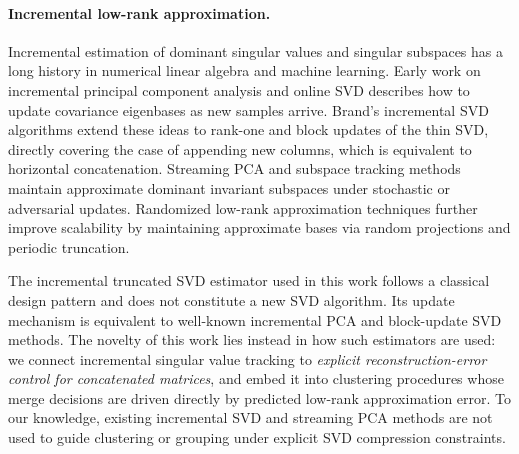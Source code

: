 \documentclass[10pt]{article} %
\begin{document}
\paragraph{Incremental low-rank approximation.}
Incremental estimation of dominant singular values and singular subspaces has a long history in numerical linear algebra and machine learning.
Early work on incremental principal component analysis and online SVD
\citep{hall1998incremental,levy2000sequential}
describes how to update covariance eigenbases as new samples arrive.
Brand’s incremental SVD algorithms
\citep{brand2002incremental,brand2006fast}
extend these ideas to rank-one and block updates of the thin SVD, directly covering the case of appending new columns, which is equivalent to horizontal concatenation. Streaming PCA and subspace tracking methods
\citep{warmuth2007randomized,mitliagkas2013memory}
maintain approximate dominant invariant subspaces under stochastic or adversarial updates.
Randomized low-rank approximation techniques
\citep{halko2011finding,woodruff2014sketching}
further improve scalability by maintaining approximate bases via random projections and periodic truncation.

The incremental truncated SVD estimator used in this work follows a classical design pattern and does not constitute a new SVD algorithm. Its update mechanism is equivalent to well-known incremental PCA and block-update SVD methods. The novelty of this work lies instead in how such estimators are used: we connect incremental singular value tracking to \emph{explicit reconstruction-error control for concatenated matrices}, and embed it into clustering procedures whose merge decisions are driven directly by predicted low-rank approximation error. To our knowledge, existing incremental SVD and streaming PCA methods are not used to guide clustering or grouping under explicit SVD compression constraints. 

\end{document}
